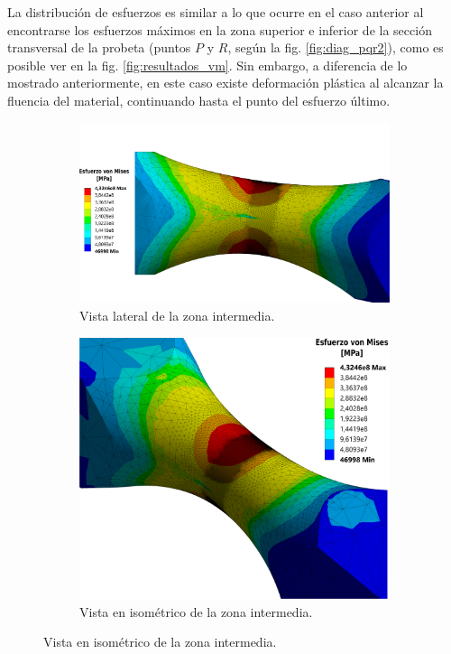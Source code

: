 La distribución de esfuerzos es similar a lo que ocurre en el caso anterior al encontrarse los esfuerzos máximos en la zona superior e inferior de la sección transversal de la probeta (puntos $P$ y $R$, según la fig. \ref{fig:diag_pqr2}), como es posible ver en la fig. \ref{fig:resultados_vm}. Sin embargo, a diferencia de lo mostrado anteriormente, en este caso existe deformación plástica al alcanzar la fluencia del material, continuando hasta el punto del esfuerzo último.


\begin{figure}[p]
\centering
	\begin{subfigure}{\linewidth}
		\centering
		\includegraphics[width=\linewidth]{Imagenes/r_lat.pdf}
		\caption{Vista lateral de la zona intermedia.}
		\label{fig:r_lat}
	\end{subfigure}
	\begin{subfigure}{0.8\linewidth}
		\centering
		\includegraphics[width=\linewidth]{Imagenes/r_iso.pdf}
		\caption{Vista en isométrico de la zona intermedia.}
		\label{fig:r_iso}
	\end{subfigure}
\end{figure}
